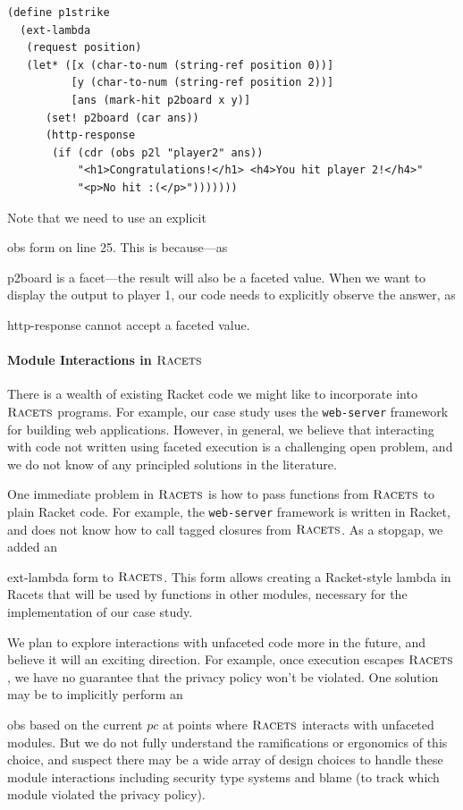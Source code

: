\documentclass[review=true,acmlarge]{acmart}
\newcommand*{\SavedLstInline}{}
\DeclareRobustCommand*{\lstinline}{%
  \ifmmode
    \let\SavedBGroup\bgroup
    \def\bgroup{%
      \let\bgroup\SavedBGroup
      \hbox\bgroup
    }%
  \fi
  \SavedLstInline
}
\newcommand{\colorFAC}{black!20!red}
\newcommand{\rmth}[1] {{\color{\colorFAC} $#1$}}
\newcommand{\code}[1]{\lstinline{#1}}
\newcommand{\racets}[0]{$\textsc{Racets}$\xspace}
\begin{document}
\begin{lstlisting}[language=Racket,escapechar=|,name=case]
(define p1strike
  (ext-lambda
   (request position)
   (let* ([x (char-to-num (string-ref position 0))]
          [y (char-to-num (string-ref position 2))]
          [ans (mark-hit p2board x y)]
      (set! p2board (car ans))
      (http-response
       (if (cdr (obs p2l "player2" ans))
           "<h1>Congratulations!</h1> <h4>You hit player 2!</h4>"
           "<p>No hit :(</p>")))))))
\end{lstlisting}

Note that we need to use an explicit \code{obs} form on
line 25. This is because---as \code{p2board} is
a facet---the result will also be a faceted value. When we want to
display the output to player 1, our code needs to explicitly observe
the answer, as \code{http-response} cannot accept a faceted value.

\paragraph*{Module Interactions in \racets}

There is a wealth of existing Racket code we might like to incorporate
into \racets programs. For example, our case study uses the
\texttt{web-server} framework for building web applications. However,
in general, we believe that interacting with code not written using
faceted execution is a challenging open problem, and we do not know of any
principled solutions in the literature.

One immediate problem in \racets is how to pass functions from \racets
to plain Racket code. For example, the \texttt{web-server} framework
is written in Racket, and does not know how to call tagged closures
from \racets. As a stopgap, we added an \code{ext-lambda} form to
\racets. This form allows creating a Racket-style lambda in Racets
that will be used by functions in other modules, necessary for the
implementation of our case study.

We plan to explore interactions with unfaceted code more in the
future, and believe it will an exciting direction. For example, once
execution escapes \racets, we have no guarantee that the privacy
policy won't be violated. One solution may be to implicitly perform an
\code{obs} based on the current \rmth{pc} at points where \racets
interacts with unfaceted modules. But we do not fully understand the
ramifications or ergonomics of this choice, and suspect there may be a
wide array of design choices to handle these module interactions
including security type systems and blame (to track which module
violated the privacy policy).
\end{document}
